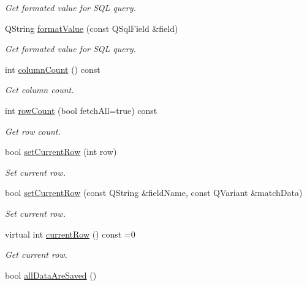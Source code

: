 \begin{DoxyCompactItemize}
\begin{DoxyCompactList}\small\item\em Get formated value for S\-Q\-L query. \end{DoxyCompactList}\item 
Q\-String \hyperlink{classmdt_abstract_sql_table_controller_ae42bd2919d96b66e9dcd73f041b6ad58}{format\-Value} (const Q\-Sql\-Field \&field)
\begin{DoxyCompactList}\small\item\em Get formated value for S\-Q\-L query. \end{DoxyCompactList}\item 
int \hyperlink{classmdt_abstract_sql_table_controller_a0dd5f5dc2934dc16ee80cbe03fc0473b}{column\-Count} () const 
\begin{DoxyCompactList}\small\item\em Get column count. \end{DoxyCompactList}\item 
int \hyperlink{classmdt_abstract_sql_table_controller_a91b9d8a7e7ab41e142baf9ba149c428e}{row\-Count} (bool fetch\-All=true) const 
\begin{DoxyCompactList}\small\item\em Get row count. \end{DoxyCompactList}\item 
bool \hyperlink{classmdt_abstract_sql_table_controller_a305a1a31db83f0f49f4a4166c4d1cad1}{set\-Current\-Row} (int row)
\begin{DoxyCompactList}\small\item\em Set current row. \end{DoxyCompactList}\item 
bool \hyperlink{classmdt_abstract_sql_table_controller_a496e148f79e951c42bb13230ea49ccd1}{set\-Current\-Row} (const Q\-String \&field\-Name, const Q\-Variant \&match\-Data)
\begin{DoxyCompactList}\small\item\em Set current row. \end{DoxyCompactList}\item 
virtual int \hyperlink{classmdt_abstract_sql_table_controller_ac1288973791ca0ef4ac41d4a3f42a45e}{current\-Row} () const =0
\begin{DoxyCompactList}\small\item\em Get current row. \end{DoxyCompactList}\item 
bool \hyperlink{classmdt_abstract_sql_table_controller_a8880c4a868ebff351f91b13247762163}{all\-Data\-Are\-Saved} ()

\end{DoxyCompactItemize}
